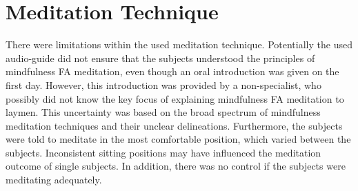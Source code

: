 \section{Meditation Technique}
%



There were limitations within the used meditation technique. Potentially the used audio-guide did not ensure that the subjects understood the principles of mindfulness FA meditation, even though an oral introduction was given on the first day. However, this introduction was provided by a non-specialist, who possibly did not know the key focus of explaining mindfulness FA meditation to laymen. This uncertainty was based on the broad spectrum of mindfulness meditation techniques and their unclear delineations. Furthermore, the subjects were told to meditate in the most comfortable position, which varied between the subjects. Inconsistent sitting positions may have influenced the meditation outcome of single subjects. In addition, there was no control if the subjects were meditating adequately.

